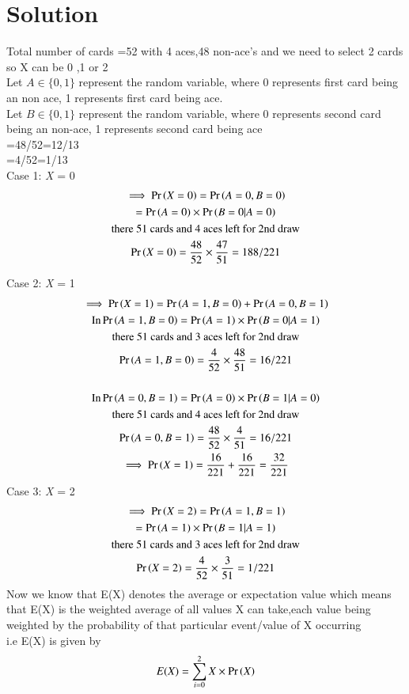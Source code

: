 \documentclass[journal,12pt,twocolumn]{IEEEtran}
\begin{document}
\section{Solution}
Total number of cards =52 with 4 aces,48 non-ace's and we need to select 2 cards
so X can be 0 ,1 or 2\\ 

Let $A \in \{0,1\}$ represent the random variable, where 0 represents first card being an non ace, 1 represents first card being ace. \\
Let $B \in \{0,1\}$ represent the random variable, where 0 represents second card being an non-ace, 1 represents second card being ace \\
=48/52=12/13\\
=4/52=1/13\\

Case 1: \emph{X} = 0
\begin{multline}
\implies \Pr\left(X=0\right)=\Pr\left(A=0,B=0\right)\\
=\Pr\left(A=0\right)\times \Pr\left(B=0|A=0\right)\\
    \text{there 51 cards and 4 aces left for 2nd draw}\\
    \Pr\left(X=0\right) = \frac{48}{52} \times \frac{47}{51}=188/221\\
\end{multline}

Case 2: \emph{X} = 1
\begin{multline}
    \implies \Pr\left(X=1\right)=\Pr\left(A=1,B=0\right)+\Pr\left(A=0,B=1 \right)\\ 
    \text{In} \Pr\left(A=1,B=0\right)=\Pr\left(A=1\right)\times \Pr\left(B=0|A=1\right)\\\text{there 51 cards and 3 aces left for 2nd draw}\\
    \Pr\left(A=1,B=0\right) = \frac{4}{52} \times \frac{48}{51}=16/221\\ \\
    \text{In} \Pr\left(A=0,B=1\right)=\Pr\left(A=0\right)\times \Pr\left(B=1|A=0\right)\\\text{there 51 cards and 4 aces left for 2nd draw}\\
    \Pr\left(A=0,B=1\right) = \frac{48}{52} \times \frac{4}{51}=16/221\\ 
    \implies\Pr\left(X=1\right)=\frac{16}{221}+\frac{16}{221}=\frac{32}{221}\\
\end{multline}
Case 3: \emph{X} = 2
\begin{multline}
    \implies \Pr\left(X=2\right)=\Pr\left(A=1,B=1\right)\\
    =\Pr\left(A=1\right)\times\Pr\left(B=1|A=1\right)\\ 
    \text{there 51 cards and 3 aces left for 2nd draw}\\
    \Pr\left(X=2\right) = \frac{4}{52} \times \frac{3}{51}=1/221\\
\end{multline}    
 Now we know that E(X) denotes the average or expectation value which means that E(X) is the weighted average of all values X can take,each value being weighted by the probability of that particular event/value of X occurring\\  
 i.e E(X) is given by\[E(X) = {\sum_{i=0}^2 X\times \Pr\left(X\right) }\]
\end{document}
